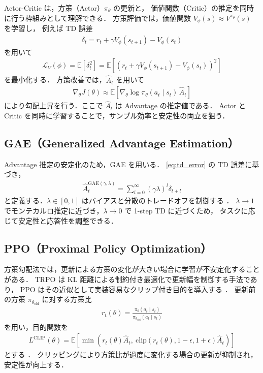 Actor-Critic は，方策（Actor）$\pi_\theta$ の更新と，
価値関数（Critic）の推定を同時に行う枠組みとして理解できる．
方策評価では，価値関数 $V_\phi(s)\approx V^{\pi_\theta}(s)$ を学習し，
例えば TD 誤差
\begin{align}
  \delta_t = r_t+\gamma V_\phi(s_{t+1})-V_\phi(s_t)
  \label{eq:td_error}
\end{align}
を用いて
\begin{align}
  \mathcal{L}_V(\phi)=\mathbb{E}\left[\delta_t^2\right]
  = \mathbb{E}\left[\left(r_t+\gamma V_\phi(s_{t+1})-V_\phi(s_t)\right)^2\right]
\end{align}
を最小化する．
方策改善では，$\hat{A}_t$ を用いて
\begin{align}
  \nabla_\theta J(\theta)\approx
  \mathbb{E}\left[\nabla_\theta\log\pi_\theta(a_t\mid s_t)\,\hat{A}_t\right]
  \label{eq:actor_update}
\end{align}
により勾配上昇を行う．ここで $\hat{A}_t$ は Advantage の推定値である．
Actor と Critic を同時に学習することで，サンプル効率と安定性の両立を狙う．

\subsection{GAE（Generalized Advantage Estimation）}
\label{subsec:GAE}

Advantage 推定の安定化のため，GAE \cite{GAE} を用いる．
\eqref{eq:td_error} の TD 誤差に基づき，
\begin{align}
  \hat{A}_t^{\mathrm{GAE}(\gamma,\lambda)}
  = \sum_{l=0}^{\infty}(\gamma\lambda)^l \delta_{t+l}
  \label{eq:gae}
\end{align}
と定義する．$\lambda\in[0,1]$ はバイアスと分散のトレードオフを制御する \cite{GAE}．
$\lambda\to 1$ でモンテカルロ推定に近づき，$\lambda\to 0$ で 1-step TD に近づくため，
タスクに応じて安定性と応答性を調整できる．

\subsection{PPO（Proximal Policy Optimization）}
\label{subsec:PPO}

方策勾配法では，更新による方策の変化が大きい場合に学習が不安定化することがある．
TRPO は KL 距離による制約付き最適化で更新幅を制御する手法であり，
PPO はその近似として実装容易なクリップ付き目的を導入する \cite{PPO}．
更新前の方策 $\pi_{\theta_{\mathrm{old}}}$ に対する方策比
\begin{align}
  r_t(\theta)=\frac{\pi_\theta(a_t\mid s_t)}{\pi_{\theta_{\mathrm{old}}}(a_t\mid s_t)}
\end{align}
を用い，目的関数を
\begin{align}
  L^{\mathrm{CLIP}}(\theta)
  =\mathbb{E}\left[\min\left(r_t(\theta)\hat{A}_t,\ \mathrm{clip}(r_t(\theta),1-\epsilon,1+\epsilon)\hat{A}_t\right)\right]
  \label{eq:ppo_clip}
\end{align}
とする \cite{PPO}．
クリッピングにより方策比が過度に変化する場合の更新が抑制され，安定性が向上する．

